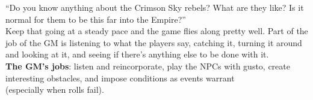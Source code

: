 {\phantom{...} “Do you know anything about the Crimson Sky rebels? What are \linebreak
\phantom{...} they like? Is it normal for them to be this far into the Empire?” \vspace{5pt} \\
Keep that going at a steady pace and the game flies along pretty well.
Part of the job of the GM is listening to what the players say, catching it,
turning it around and looking at it, and seeing if there’s anything else to
be done with it. \vspace{5pt} \\
\textbf{The GM’s jobs}: listen and reincorporate, play the NPCs with gusto,
create interesting obstacles, and impose conditions as events
warrant \\
\phantom{.....} (especially when rolls fail).
}


